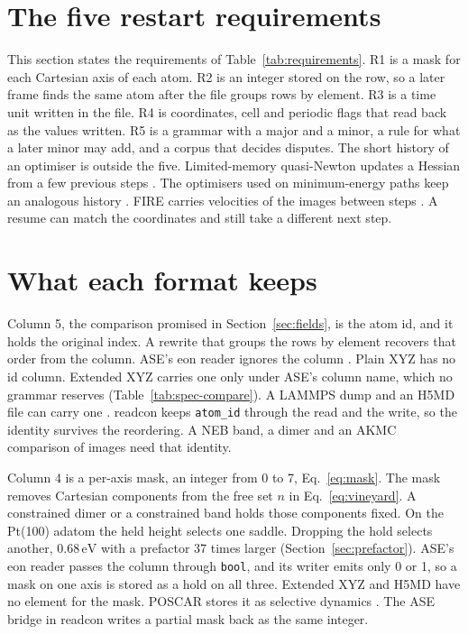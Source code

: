 \section{The five restart requirements}\label{sec:supp-requirements}
This section states the requirements of Table~\ref{tab:requirements}.
R1 is a mask for each Cartesian axis of each atom.
R2 is an integer stored on the row, so a later frame finds the same atom after the file groups rows by element.
R3 is a time unit written in the file.
R4 is coordinates, cell and periodic flags that read back as the values written.
R5 is a grammar with a major and a minor, a rule for what a later minor may add, and a corpus that decides disputes.
The short history of an optimiser is outside the five.
Limited-memory quasi-Newton updates a Hessian from a few previous steps \cite{nocedalUpdatingQuasinewtonMatrices1980}.
The optimisers used on minimum-energy paths keep an analogous history \cite{sheppardOptimizationMethodsFinding2008}.
FIRE carries velocities of the images between steps \cite{bitzekStructuralRelaxationMade2006}.
A resume can match the coordinates and still take a different next step.

\section{What each format keeps}\label{sec:supp-fields}
Column 5, the comparison promised in Section~\ref{sec:fields}, is the atom id, and it holds the original index.
A rewrite that groups the rows by element recovers that order from the column.
ASE's eon reader ignores the column
\cite{larsenAtomicSimulationEnvironmenta2017}.
Plain XYZ has no id column.
Extended XYZ carries one only under ASE's column name, which no grammar reserves
\cite{kermodeLibatomsExtxyzV0462026} (Table~\ref{tab:spec-compare}).
A LAMMPS dump and an H5MD file can carry one
\cite{thompsonLammpsFlexibleSimulation2022,buylH5mdStructuredEfficient2014}.
readcon keeps \texttt{atom\_id} through the read and the write, so the identity survives the reordering.
A NEB band, a dimer and an AKMC comparison of images need that identity.

Column 4 is a per-axis mask, an integer from 0 to 7, Eq.~\eqref{eq:mask}.
The mask removes Cartesian components from the free set \(n\) in Eq.~\eqref{eq:vineyard}.
A constrained dimer or a constrained band holds those components fixed.
On the Pt(100) adatom the held height selects one saddle.
Dropping the hold selects another, \(0.68\,\mathrm{eV}\) with a prefactor 37 times larger (Section~\ref{sec:prefactor}).
ASE's eon reader passes the column through \texttt{bool}, and its writer emits only 0 or 1, so a mask on one axis is stored as a hold on all three.
Extended XYZ and H5MD have no element for the mask.
POSCAR stores it as selective dynamics
\cite{vaspwikiPoscar2026}.
The ASE bridge in readcon writes a partial mask back as the same integer.


